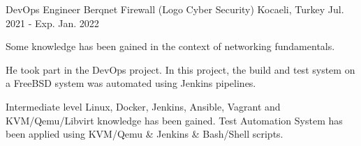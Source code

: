 \begin{cventries}
  \cventry
    {DevOps Engineer} %
    {Berqnet Firewall (Logo Cyber Security)} %
    {Kocaeli, Turkey} %
    {Jul. 2021 - Exp. Jan. 2022} %
    {
      \begin{cvitems} %
        \item {Some knowledge has been gained in the context of networking fundamentals.}
        \item {He took part in the DevOps project. In this project, the build and test system on a FreeBSD system was automated using Jenkins pipelines.}
        \item {Intermediate level Linux, Docker, Jenkins, Ansible, Vagrant and KVM/Qemu/Libvirt knowledge has been gained. Test Automation System has been applied using KVM/Qemu \& Jenkins \& Bash/Shell scripts.}
      \end{cvitems}
    }

\end{cventries}
